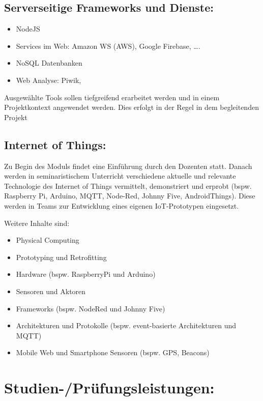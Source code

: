 \subsection{Serverseitige Frameworks und
Dienste:}\label{serverseitige-frameworks-und-dienste-1}

\begin{itemize}
\tightlist
\item
  NodeJS
\item
  Services im Web: Amazon WS (AWS), Google Firebase, \ldots{}.
\item
  NoSQL Datenbanken
\item
  Web Analyse: Piwik,
\end{itemize}

Ausgewählte Tools sollen tiefgreifend erarbeitet werden und in einem
Projektkontext angewendet werden. Dies erfolgt in der Regel in dem
begleitenden Projekt

\subsection{Internet of Things:}\label{internet-of-things-1}

Zu Begin des Moduls findet eine Einführung durch den Dozenten statt.
Danach werden in seminaristischem Unterricht verschiedene aktuelle und
relevante Technologie des Internet of Things vermittelt, demonstriert
und erprobt (bspw. Raspberry Pi, Arduino, MQTT, Node-Red, Johnny Five,
AndroidThings). Diese werden in Teams zur Entwicklung eines eigenen
IoT-Prototypen eingesetzt.

Weitere Inhalte sind:

\begin{itemize}
\tightlist
\item
  Physical Computing
\item
  Prototyping und Retrofitting
\item
  Hardware (bspw. RaspberryPi und Arduino)
\item
  Sensoren und Aktoren
\item
  Frameworks (bspw. NodeRed und Johnny Five)
\item
  Architekturen und Protokolle (bspw. event-basierte Architekturen und
  MQTT)
\item
  Mobile Web und Smartphone Sensoren (bspw. GPS, Beacons)
\end{itemize}

\section{Studien-/Prüfungsleistungen:}\label{studien-pruxfcfungsleistungen-30}

